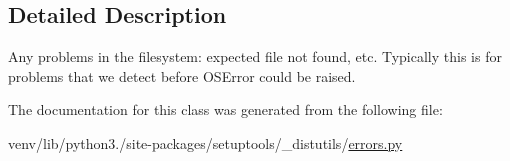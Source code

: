 \subsection{Detailed Description}
\begin{DoxyVerb}Any problems in the filesystem: expected file not found, etc.
Typically this is for problems that we detect before OSError
could be raised.\end{DoxyVerb}
 

The documentation for this class was generated from the following file\+:\begin{DoxyCompactItemize}
\item 
venv/lib/python3./site-\/packages/setuptools/\+\_\+distutils/\hyperlink{__distutils_2errors_8py}{errors.\+py}\end{DoxyCompactItemize}
